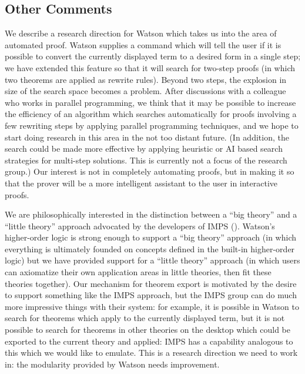 \documentclass{kluwer}
\begin{document}
\begin{article}
\subsection{Other Comments}
We describe a research direction for Watson which takes us into the
area of automated proof. Watson supplies a command which will tell
the user if it is possible to convert the currently displayed term to
a desired form in a single step; we have extended this feature so that
it will search for two-step proofs (in which two theorems are applied
as rewrite rules). Beyond two steps, the explosion in size of the
search space becomes a problem. After discussions with a colleague
who works in parallel programming, we think that it may be possible to
increase the efficiency of an algorithm which searches automatically
for proofs involving a few rewriting steps by applying parallel
programming techniques, and we hope to start doing research in this
area in the not too distant future. (In addition, the search could be made
more effective by applying heuristic or AI based search strategies for
multi-step solutions. This is currently not a focus of the research group.)
Our interest is not in completely automating proofs, but in making it
 so that the prover will be a more intelligent assistant to the user
in interactive proofs.

We are philosophically interested in the distinction between a ``big
theory'' and a ``little theory'' approach advocated by the developers of
IMPS (\cite{imps}). Watson's higher-order logic is strong enough to
support a ``big theory'' approach (in which everything is ultimately
founded on concepts defined in the built-in higher-order logic) but we have
provided support for a ``little theory'' approach (in which users can
axiomatize their own application areas in little theories, then fit
these theories together). Our mechanism for theorem export is
motivated by the desire to support something like the IMPS approach,
but the IMPS group can do much more impressive things with their
system: for example, it is possible in Watson to search for theorems
which apply to the currently displayed term, but it is not possible to
search for theorems in other theories on the desktop which could be
exported to the current theory and applied: IMPS has a capability
analogous to this which we would like to emulate. This is a research
direction we need to work in: the modularity provided by Watson needs
improvement.


\begin{thebibliography}{99}


\end{thebibliography}
\end{article}
\end{document}
